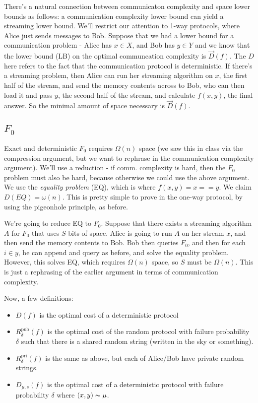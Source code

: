 \documentclass[11pt]{article}
\newcommand{\on}{\operatorname}
\begin{document}
\smallskip

There's a natural connection between communicaton complexity and space lower bounds as follows: a communication complexity lower bound can yield a streaming lower bound. We'll restrict our attention to 1-way protocols, where Alice just sends messages to Bob. Suppose that we had a lower bound for a communication problem - Alice has $x \in X$, and Bob has $y \in Y$ and we know that the lower bound (LB) on the optimal communcation complexity is $\overrightarrow{D}(f)$. The $D$ here refers to the fact that the communication protocol is deterministic. If there's a streaming problem, then Alice can run her streaming algorithm on $x$, the first half of the stream, and send the memory contents across to Bob, who can then load it and pass $y$, the second half of the stream, and calculate $f(x, y)$, the final answer. So the minimal amount of space necessary is $\overrightarrow{D}(f)$. 

\subsection{$F_0$}
Exact and deterministic $F_0$ requires $\Omega(n)$ space (we saw this in class via the compression argument, but we want to rephrase in the communication complexity argument). We'll use a reduction - if comm. complexity is hard, then the $F_0$ problem must also be hard, because otherwise we could use the above argument. We use the \emph{equality problem} (EQ), which is where $f(x, y) = x == y$. We claim $D(EQ) = \omega(n)$. This is pretty simple to prove in the one-way protocol, by using the pigeonhole principle, as before. 

\smallskip

We're going to reduce EQ to $F_0$. Suppose that there exists a streaming algorithm $A$ for $F_0$ that uses $S$ bits of space. Alice is going to run $A$ on her stream $x$, and then send the memory contents to Bob. Bob then queries $F_0$, and then for each $i \in y$, he can append and query as before, and solve the equality problem. However, this solves EQ, which requires $\Omega(n)$ space, so $S$ must be $\Omega(n)$. This is just a rephrasing of the earlier argument in terms of communication complexity. 

\smallskip

Now, a few definitions: 
\begin{itemize}
  \item $D(f)$ is the optimal cost of a deterministic protocol 
  \item $R^{\on{pub}}_\delta(f)$ is the optimal cost of the random protocol with failure probability $\delta$ such that there is a shared random string (written in the sky or something).
  \item $R^{\on{pri}}_\delta(f)$ is the same as above, but each of Alice/Bob have private random strings.
  \item $D_{\mu, s}(f)$ is the optimal cost of a deterministic protocol with failure probability $\delta$ where $(x, y) \thicksim \mu$. 
\end{itemize}
\end{document}
